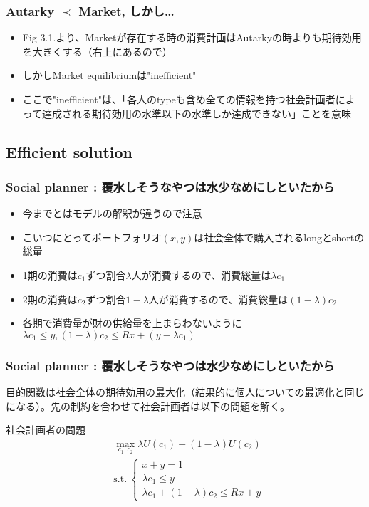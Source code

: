 \documentclass[dvipdfmx, 12pt]{beamer}
\begin{document}
\begin{frame}\frametitle{Autarky $\prec$ Market, しかし…}
	\begin{itemize}
		\item Fig 3.1.より、Marketが存在する時の消費計画はAutarkyの時よりも期待効用を大きくする（右上にあるので）
		\item しかしMarket equilibriumは"inefficient"
		\item ここで"inefficient"は、「各人のtypeも含め全ての情報を持つ社会計画者によって達成される期待効用の水準以下の水準しか達成できない」ことを意味
	\end{itemize}
\end{frame}

\subsection{Efficient solution}
\begin{frame}\frametitle{Social planner : \small 覆水しそうなやつは水少なめにしといたから}
	\begin{itemize}
		\item 今までとはモデルの解釈が違うので注意
		\item こいつにとってポートフォリオ$(x, y)$は社会全体で購入されるlongとshortの総量
		\item 1期の消費は$c_1$ずつ割合$\lambda$人が消費するので、消費総量は$\lambda c_1$
		\item 2期の消費は$c_2$ずつ割合$1-\lambda$人が消費するので、消費総量は$(1 - \lambda)c_2$
		\item 各期で消費量が財の供給量を上まらわないように$\lambda c_1 \leq y, (1 - \lambda)c_2 \leq Rx + (y - \lambda c_1)$
	\end{itemize}
\end{frame}
\begin{frame}\frametitle{Social planner : \small 覆水しそうなやつは水少なめにしといたから}
	目的関数は社会全体の期待効用の最大化（結果的に個人についての最適化と同じになる）。先の制約を合わせて社会計画者は以下の問題を解く。
	\begin{itembox}[l]{社会計画者の問題}
	\begin{align*}
		&\max_{c_1, c_2} \lambda U(c_1) + (1 - \lambda) U(c_2) \\
		&\text{s.t.}\
    		\begin{cases}
                		x + y = 1 \\
                		\lambda c_1 \leq y \\
                		\lambda c_1 + (1-\lambda)c_2 \leq Rx + y
    		\end{cases}
	\end{align*}
	\end{itembox}
\end{frame}
\end{document}

